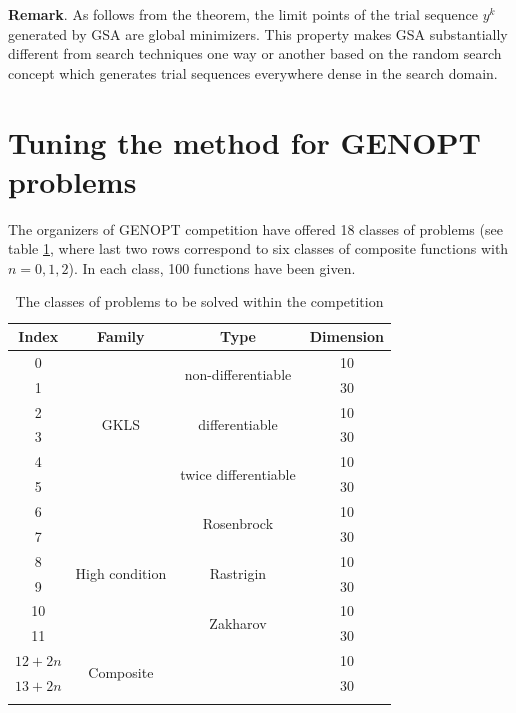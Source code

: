 \documentclass{llncs}
\begin{document}
\textbf{Remark}. As follows from the theorem, the limit points of the trial sequence ${y^k}$ generated by GSA are global minimizers. This property makes GSA substantially different from search techniques one way or another based on the random search concept which generates trial sequences everywhere dense in the search domain.


\section{Tuning the method for GENOPT problems}\label{sec:3}

The organizers of GENOPT competition have offered 18 classes of problems (see table \ref{tab:problems}, %
where last two rows correspond to six classes of composite functions with $n=0,1,2$). In each class, 100 functions have been given.

\begin{table}
	\caption{The classes of problems to be solved within the competition}
	\label{tab:problems}
	\center
	\begin{tabular}{cccc}
		\hline\noalign{\smallskip}
		Index & Family & Type & Dimension \\
		\hline\noalign{\smallskip}
		0 &	 \multirow{6}{*}{GKLS} &	\multirow{2}{*}{non-differentiable} & 10 \\
		1 &	 &	 & 30 \\
		2 &	  &	\multirow{2}{*}{differentiable} & 10 \\
		3 &	 &	 & 30 \\
		4 &	  &	\multirow{2}{*}{twice differentiable} & 10 \\
		5 &	 &	 & 30 \\
		\hline\noalign{\smallskip}		
		6 &	\multirow{6}{*}{High condition}  &	\multirow{2}{*}{Rosenbrock} & 10 \\
		7 &	 &	 & 30 \\
		8 &	  &	\multirow{2}{*}{Rastrigin} & 10 \\
		9 &	 &	 & 30 \\
		10 &	  &	\multirow{2}{*}{Zakharov} & 10 \\
		11 &	 &	 & 30 \\
		\hline\noalign{\smallskip}
		$12+2n$ &	\multirow{2}{*}{Composite}  &	 & 10 \\
		$13+2n$ &	 &	 & 30 \\
\noalign{\smallskip}\hline
	\end{tabular}
\end{table}
\end{document}
